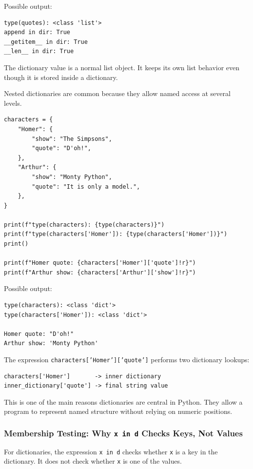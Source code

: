 Possible output:

\begin{verbatim}
type(quotes): <class 'list'>
append in dir: True
__getitem__ in dir: True
__len__ in dir: True
\end{verbatim}

The dictionary value is a normal list object. It keeps its own list behavior even though it is stored inside a dictionary.

Nested dictionaries are common because they allow named access at several levels.

\begin{verbatim}
characters = {
    "Homer": {
        "show": "The Simpsons",
        "quote": "D'oh!",
    },
    "Arthur": {
        "show": "Monty Python",
        "quote": "It is only a model.",
    },
}

print(f"type(characters): {type(characters)}")
print(f"type(characters['Homer']): {type(characters['Homer'])}")
print()

print(f"Homer quote: {characters['Homer']['quote']!r}")
print(f"Arthur show: {characters['Arthur']['show']!r}")
\end{verbatim}

Possible output:

\begin{verbatim}
type(characters): <class 'dict'>
type(characters['Homer']): <class 'dict'>

Homer quote: "D'oh!"
Arthur show: 'Monty Python'
\end{verbatim}

The expression \texttt{characters['Homer']['quote']} performs two dictionary lookups:

\begin{verbatim}
characters['Homer']       -> inner dictionary
inner_dictionary['quote'] -> final string value
\end{verbatim}

This is one of the main reasons dictionaries are central in Python. They allow a program to represent named structure without relying on numeric positions.

\subsubsection{Membership Testing: Why \texttt{x in d} Checks Keys, Not Values}

For dictionaries, the expression \texttt{x in d} checks whether \texttt{x} is a key in the dictionary. It does not check whether \texttt{x} is one of the values.

